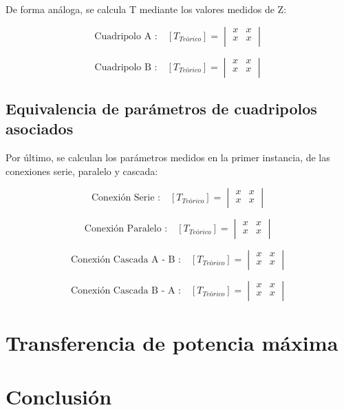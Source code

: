 \documentclass[a4paper]{article}
\begin{document}
De forma análoga, se calcula T mediante los valores medidos de Z: 

\begin{equation}
\text{Cuadripolo A :}\quad [T_{Teórico}] =
\begin{vmatrix}
	x & x\\
	x & x\\
\end{vmatrix}
\end{equation}

\begin{equation}
\text{Cuadripolo B :}\quad [T_{Teórico}] =
\begin{vmatrix}
	x & x\\
	x & x\\
\end{vmatrix}
\end{equation}

\subsection*{Equivalencia de parámetros de cuadripolos asociados}

Por último, se calculan los parámetros medidos en la primer instancia, de las conexiones serie, paralelo y cascada:

\begin{equation}
\text{Conexión Serie :}\quad [T_{Teórico}] =
\begin{vmatrix}
	x & x\\
	x & x\\
\end{vmatrix}
\end{equation}

\begin{equation}
\text{Conexión Paralelo :}\quad [T_{Teórico}] =
\begin{vmatrix}
	x & x\\
	x & x\\
\end{vmatrix}
\end{equation}

\begin{equation}
\text{Conexión Cascada A - B :}\quad [T_{Teórico}] =
\begin{vmatrix}
	x & x\\
	x & x\\
\end{vmatrix}
\end{equation}

\begin{equation}
\text{Conexión Cascada B - A :}\quad [T_{Teórico}] =
\begin{vmatrix}
	x & x\\
	x & x\\
\end{vmatrix}
\end{equation}

\section*{Transferencia de potencia máxima}

\section*{Conclusión}
\end{document}
